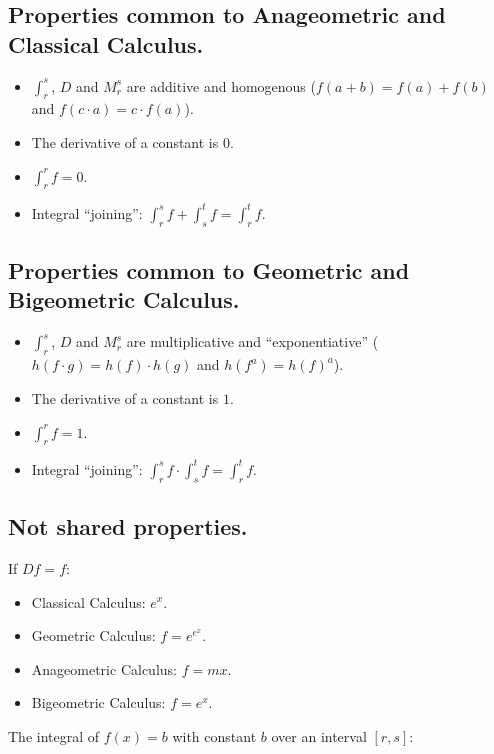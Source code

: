 \newpage

\subsection{Properties common to Anageometric and Classical Calculus.}

\begin{itemize}
	\item $\int_r^s$, $D$ and $M_r^s$ are additive and homogenous ($f(a + b) = f(a) + f(b)$ and $f(c\cdot a) = c\cdot f(a)$).
	\item The derivative of a constant is $0$.
	\item $\int_r^r f = 0$.
	\item Integral \enquote{joining}: $\int_r^s f + \int_s^t f = \int_r^t f$.
\end{itemize}

\subsection{Properties common to Geometric and Bigeometric Calculus.}

\begin{itemize}
	\item $\int_r^s$, $D$ and $M_r^s$ are multiplicative and \enquote{exponentiative} ($h(f\cdot g) = h(f)\cdot h(g)$ and $h(f^a) = h(f)^a$).
	\item The derivative of a constant is $1$.
	\item $\int_r^r f = 1$.
	\item Integral \enquote{joining}: $\int_r^s f \cdot \int_s^t f = \int_r^t f$.
\end{itemize}

\subsection{Not shared properties.}

If $Df = f$:

\begin{itemize}
	\item Classical Calculus: $e^x$.
	\item Geometric Calculus: $f = e^{e^x}$.
	\item Anageometric Calculus: $f = mx$.
	\item Bigeometric Calculus: $f = e^x$.
\end{itemize}

The integral of $f(x) = b$ with constant $b$ over an interval $[r, s]$:

